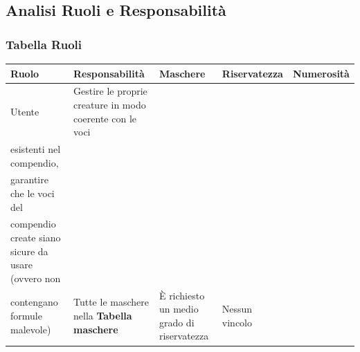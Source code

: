 \documentclass[a4paper, 11pt]{article}
\let\newline\\
\begin{document}
\clearpage
\newpage
\subsection{Analisi Ruoli e Responsabilità}
\subsubsection*{Tabella Ruoli}
\begin{adjustwidth}{-1cm}{-1cm}
\begin{center}
    \begin{tabular}{|p{1.5cm}|p{5cm}|p{3cm}|p{2.5cm}|p{2.5cm}|}
        \hline
        \textbf{Ruolo} & \textbf{Responsabilità} & \textbf{Maschere} & \textbf{Riservatezza} & \textbf{Numerosità} \\\hline
        Utente & Gestire le proprie creature in modo coerente con le voci \newline esistenti nel compendio, \newline garantire che le voci del \newline compendio create siano sicure da usare (ovvero non \newline contengano formule malevole) & Tutte le maschere nella \textbf{Tabella maschere} & È richiesto un medio grado di riservatezza & Nessun vincolo \\\hline
    \end{tabular}
\end{center}
\end{adjustwidth}
\end{document}
